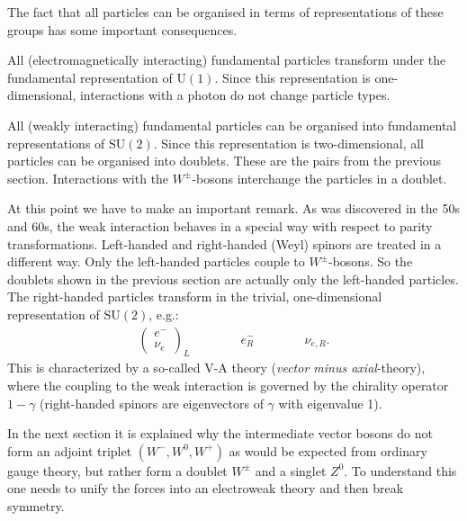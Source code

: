     The fact that all particles can be organised in terms of representations of these groups has some important consequences.
    \begin{property}[Electromagnetism]
        All (electromagnetically interacting) fundamental particles transform under the fundamental representation of $\mathrm{U}(1)$. Since this representation is one-dimensional, interactions with a photon do not change particle types.
    \end{property}
    \begin{property}
        All (weakly interacting) fundamental particles can be organised into fundamental representations of $\mathrm{SU}(2)$. Since this representation is two-dimensional, all particles can be organised into doublets. These are the pairs from the previous section. Interactions with the $W^\pm$-bosons interchange the particles in a doublet.

        At this point we have to make an important remark. As was discovered in the 50s and 60s, the weak interaction behaves in a special way with respect to parity transformations. Left-handed and right-handed (Weyl) spinors are treated in a different way. Only the left-handed particles couple to $W^\pm$-bosons. So the doublets shown in the previous section are actually only the left-handed particles. The right-handed particles transform in the trivial, one-dimensional representation of $\mathrm{SU}(2)$, e.g.:
        \begin{gather*}
            \begin{pmatrix}
                e^-\\
                \nu_e
            \end{pmatrix}_L
            \qquad\qquad e^-_R\qquad\qquad\nu_{e,R}.
        \end{gather*}
        This is characterized by a so-called V-A theory (\textit{vector minus axial}-theory), where the coupling to the weak interaction is governed by the chirality operator $1-\gamma$ (right-handed spinors are eigenvectors of $\gamma$ with eigenvalue 1).

        In the next section it is explained why the intermediate vector bosons do not form an adjoint triplet $(W^-,W^0,W^+)$ as would be expected from ordinary gauge theory, but rather form a doublet $W^\pm$ and a singlet $Z^0$. To understand this one needs to unify the forces into an electroweak theory and then break symmetry.
    \end{property}
